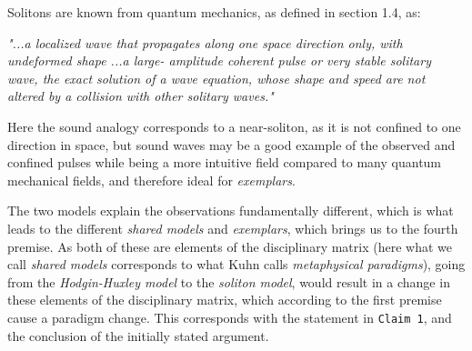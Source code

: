 Solitons are known from quantum mechanics, as defined in \cite{book:949176} section 1.4, as:
\begin{center}
\textit{"...a localized wave that propagates along one space direction only, with undeformed shape ...a large- amplitude coherent pulse or very stable solitary wave, the exact solution of a wave equation, whose shape and speed are not altered by a collision with other solitary waves."}
\end{center}

Here the sound analogy corresponds to a near-soliton, as it is not confined to one direction in space, but sound waves may be a good example of the observed and confined pulses while being a more intuitive field compared to many quantum mechanical fields, and therefore ideal for \textit{exemplars}.

The two models explain the observations fundamentally different, which is what leads to the different \textit{shared models} and \textit{exemplars}, which brings us to the fourth premise. As both of these are elements of the disciplinary matrix (here what we call \textit{shared models} corresponds to what Kuhn calls \textit{metaphysical paradigms}), going from the \textit{Hodgin-Huxley model} to the \textit{soliton model}, would result in a change in these elements of the disciplinary matrix, which according to the first premise cause a paradigm change. This corresponds with the statement in \texttt{Claim 1}, and the conclusion of the initially stated argument.